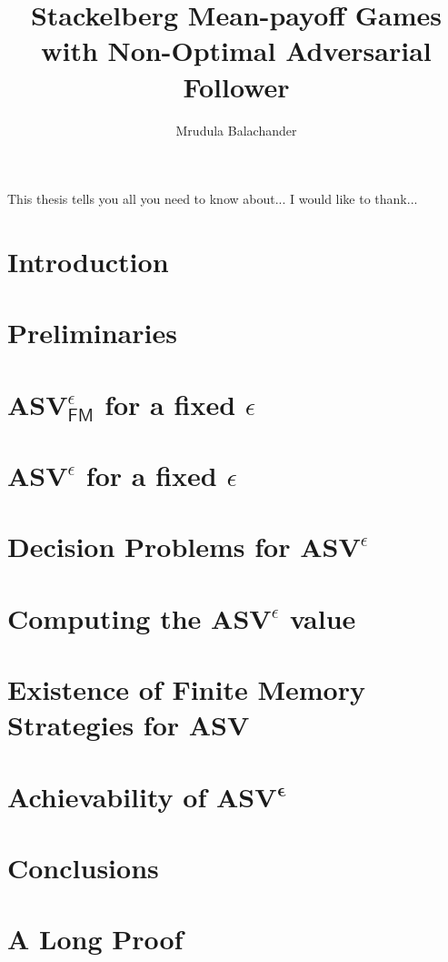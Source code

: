 \documentclass{report}
\begin{document}
\title{Stackelberg Mean-payoff Games with Non-Optimal Adversarial Follower}
\author{Mrudula Balachander}
 
\beforepreface
{}
This thesis tells you all you need to know about...
I would like to thank...
\afterpreface

\chapter{Introduction}
	\label{sec:intro}
	

\chapter{Preliminaries}
  	\label{sec:prelim}
  	

\chapter{$\mathbf{ASV}^{\epsilon}_{\mathsf{FM}}$ for a fixed $\epsilon$}
	\label{sec:FMStrategy}
	

\chapter{$\mathbf{ASV}^{\epsilon}$ for a fixed $\epsilon$}
	

\chapter{Decision Problems for $\mathbf{ASV}^{\epsilon}$}
	

\chapter{Computing the $\mathbf{ASV}^{\epsilon}$ value}
	

\chapter{Existence of Finite Memory Strategies for ASV}
	\label{sec:FMASV}
	

\chapter{Achievability of $\mathbf{ASV^{\epsilon}}$}
	

\chapter{Conclusions}

\appendix
	\chapter{A Long Proof}
		


	
\end{document}
